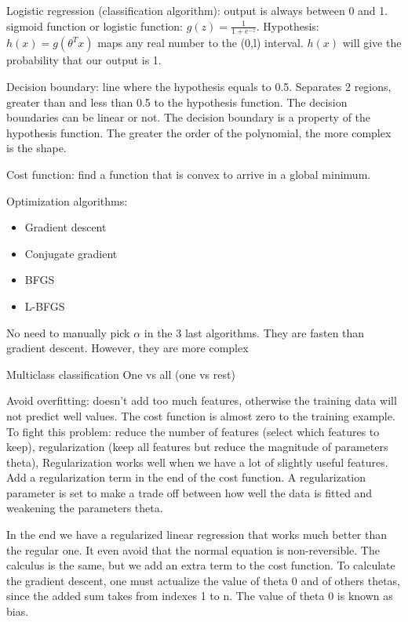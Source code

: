 \documentclass[12pt,a4paper]{report}
\begin{document}
Logistic regression (classification algorithm): output is always between 0 and 1. sigmoid function or logistic function: $g(z) = \frac{1}{1+e^{-z}}$. Hypothesis: $h(x)=g(\theta^{T}x)$ maps any real number to the (0,l) interval. $h(x)$ will give the probability that our output is 1.


Decision boundary: line where the hypothesis equals to 0.5. Separates 2 regions, greater than and less than 0.5 to the hypothesis function. The decision boundaries can be linear or not.
	The decision boundary is a property of the hypothesis function. The greater the order of the polynomial, the more complex is the shape.
	
Cost function: find a function that is convex to arrive in a global minimum.

Optimization algorithms:
	\begin{itemize}
	\item Gradient descent
	\item Conjugate gradient
	\item BFGS
	\item L-BFGS
	\end{itemize}

No need to manually pick $\alpha$ in the 3 last algorithms. They are fasten than gradient descent. However, they are more complex


Multiclass classification
	One vs all (one vs rest)
 

	
Avoid overfitting: doesn't add too much features, otherwise the training data will not predict well values.	The cost function is almost zero to the training example.
	To fight this problem: reduce the number of features (select which features to keep), regularization (keep all features but reduce the magnitude of parameters theta), Regularization works well when we have a lot of slightly useful features.
	Add a regularization term in the end of the cost function. A regularization parameter is set to make a trade off between how well the data is fitted and weakening the parameters theta.
	
In the end we have a regularized linear regression that works much better than the regular one. It even avoid that the normal equation is non-reversible. The calculus is the same, but we add an extra term to the cost function.	To calculate the gradient descent, one must actualize the value of theta 0 and of others thetas, since the added sum takes from indexes 1 to n. The value of theta 0 is known as bias.
\end{document}
